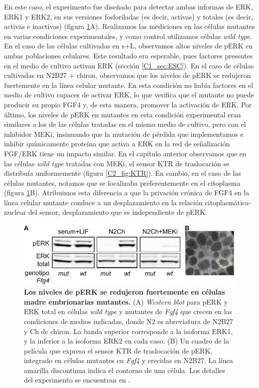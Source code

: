 \documentclass[./main.tex]{subfiles}
\begin{document}
En este caso, el experimento fue diseñado para detectar ambas informas de ERK, ERK1 y ERK2, en sus versiones fosforiladas (es decir, activas) y totales (es decir, activas e inactivas) (figura \ref{C3_fig:FGF_mutante}A). Realizamos las mediciones en las células mutantes en varias condiciones experimentales, y como control utilizamos células \textit{wild type}. En el caso de las células cultivadas en s+L, observamos altos niveles de pERK en ambas poblaciones celulares. Este resultado era esperable, pues factores presentes en el medio de cultivo activan ERK (sección \ref{C1_sec:ESC}). En el caso de células cultivadas en N2B27 + chiron, observamos que los niveles de pERK se redujeron fuertemente en la línea celular mutante. En esta condición no había factores en el medio de cultivo capaces de activar ERK, lo que verifica que el mutante no puede producir su propio FGF4 y, de esta manera, promover la activación de ERK. Por último, los niveles de pERK en mutantes en esta condición experimental eran similares a los de las células tratadas en el mismo medio de cultivo, pero con el inhibidor MEKi, insinuando que la mutación de pérdida que implementamos e inhibir químicamente proteína que activa a ERK en la red de señalización FGF/ERK tiene un impacto similar. En el capítulo anterior observamos que en las células \textit{wild type} tratadas con MEKi, el sensor KTR de traslocación se distribuía uniformemente (figura \ref{C2_fig:KTR}). En cambio, en el caso de las células mutantes, notamos que se localizaba preferentemente en el citoplasma (figura \ref{C3_fig:FGF_mutante}B). Atribuimos esta diferencia a que la privación crónica de FGF4 en la línea celular mutante conduce a un desplazamiento en la relación citoplasmática-nuclear del sensor, desplazamiento que es independiente de pERK. 



\begin{figure}
    \centering
    \includegraphics[width=1\columnwidth]{figures/chapter3/C3_FGF_mutant.pdf} 
    \caption{\textbf{Los niveles de pERK se redujeron fuertemente en células madre embrionarias mutantes.} (A) \textit{Western blot} para pERK y ERK total en células \textit{wild type} y mutantes de \textit{Fgf4} que crecen en las condiciones de medios indicadas, donde N2 es abreviatura de N2B27 y Ch de chiron. La banda superior corresponde a la isoforma ERK1, y la inferior a la isoforma ERK2 en cada caso. (B) Un cuadro de la película que expresa el sensor KTR de traslocación de pERK, integrado en células mutantes en \textit{Fgf4} y crecidas en N2B27. La línea amarilla discontinua indica el contorno de una célula. Los detalles del experimento se encuentran en \cite{Fabris2022}.}
    \label{C3_fig:FGF_mutante}
\end{figure}
\end{document}
